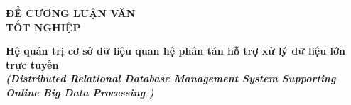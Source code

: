 \documentclass{article}[14pt]
\begin{document}
   
    \begin{figure}[h]
        \begin{floatrow}
        {%
    
        }
        {%
    
        }
        \end{floatrow}
    \end{figure}
    
    \begin{center}
        
        \textbf{\Large ĐỀ CƯƠNG LUẬN VĂN \\  TỐT NGHIỆP} \\ 
    \end{center}
    
    
    \begin{center}
        
        \textbf{\huge Hệ quản trị cơ sở dữ liệu quan hệ phân tán hỗ trợ xử lý dữ liệu lớn trực tuyến } 
        \\
        
    \vspace{.5cm}
        \textit{\textbf{\Large (Distributed Relational Database Management System Supporting Online Big Data Processing  )}}
    \end{center}
    
\end{document}
